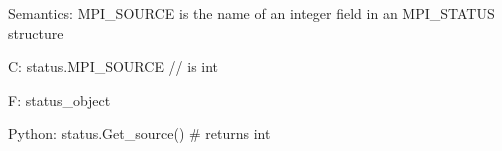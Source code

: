 Semantics:
MPI_SOURCE is the name of an integer field
in an MPI_STATUS structure


C:
status.MPI_SOURCE // is int

F:
status_object%

Python:
status.Get_source() # returns int
